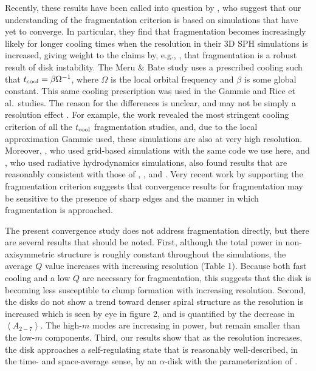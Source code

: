 \documentclass[manuscript]{aastex}
\begin{document}
Recently, these results have been called into question by \cite{meru2011a}, who suggest that our understanding of the
fragmentation criterion is based on simulations that have yet to converge.  In particular, they find that fragmentation
becomes increasingly likely for longer cooling times when the resolution in their 3D SPH simulations is increased,
giving weight to the claims by, e.g., \cite{boss2009}, that fragmentation is a robust result of disk instability. The
Meru \& Bate study uses a prescribed cooling such that $t_{\rm cool}=\beta\Omega^{-1}$, where $\Omega$ is the local
orbital frequency and $\beta$ is some global constant.  This same cooling prescription was used in the Gammie and Rice
et al.~studies.  The reason for the differences is unclear, and may not be simply a resolution effect \citep{lodato2011}.  For example, the \citeauthor{gammie2001} work revealed the most stringent cooling criterion of
all the $t_{\rm cool}$ fragmentation studies, and, due to the local approximation Gammie used, these simulations are also at
very high resolution. Moreover, \cite{mejia2005}, who used grid-based simulations with the same code we use
here, and  \cite{boley2008}, who used radiative hydrodynamics simulations, also found results that are
reasonably consistent with those of \citet{gammie2001}, \citet{rice2005}, and \cite{cossins2010}. Very recent
work by \citet{paardekooper2011} supporting the \citeauthor{gammie2001} fragmentation criterion suggests that
convergence results for fragmentation may be sensitive to the presence of sharp edges and the manner in which
fragmentation is approached.

The present convergence study does not address fragmentation directly, but there are several results that should be noted.  First, although the total power in non-axisymmetric structure is roughly constant throughout the simulations, the average $Q$ value increases with increasing resolution (Table 1).  Because both fast cooling and a low $Q$ are necessary
for fragmentation, this suggests that the disk is becoming less susceptible to clump formation with increasing resolution.   Second, the disks do not show a trend toward denser spiral structure as the resolution is increased which is seen by eye in figure 2, and is quantified by the decrease in $\left<A_{2-7}\right>$.  The high-$m$ modes are increasing in power, but remain smaller than the low-$m$ components.   Third, our results show that as the resolution increases, the disk approaches a self-regulating state that is reasonably well-described, in the time- and space-average sense, by an $\alpha$-disk with the parameterization of \cite{gammie2001}. 
\end{document}
